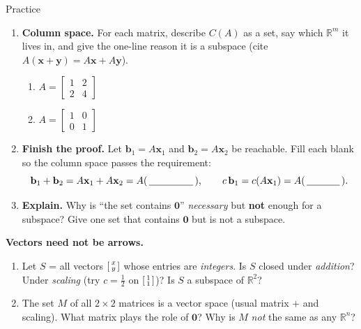 \documentclass[10pt]{article}
\newcommand{\xx}{\mathbf{x}}
\newcommand{\yy}{\mathbf{y}}
\newcommand{\bb}{\mathbf{b}}
\newcommand{\zero}{\mathbf{0}}
\begin{document}
\begin{notesbox}{Practice}
\begin{enumerate}[leftmargin=1.9em, itemsep=11pt]
\begin{enumerate}[label=(\alph*), leftmargin=1.8em, itemsep=6pt]
    \end{enumerate}
  \item \textbf{Column space.} For each matrix, describe $C(A)$ as a set, say which $\mathbb{R}^m$ it
        lives in, and give the one-line reason it is a subspace (cite $A(\xx+\yy)=A\xx+A\yy$).
    \begin{enumerate}[label=(\alph*), leftmargin=1.8em, itemsep=4pt]
      \item $A=\begin{bmatrix} 1 & 2 \\ 2 & 4 \end{bmatrix}$ \hfill
      \item $A=\begin{bmatrix} 1 & 0 \\ 0 & 1 \end{bmatrix}$
    \end{enumerate}
    \vspace{1.1cm}
  \item \textbf{Finish the proof.} Let $\bb_1=A\xx_1$ and $\bb_2=A\xx_2$ be reachable. Fill each
        blank so the column space passes the requirement:
        \[ \bb_1+\bb_2=A\xx_1+A\xx_2=A(\,\blank{1.6cm}\,), \qquad c\,\bb_1=c(A\xx_1)=A(\,\blank{1.2cm}\,). \]
        \vspace{0.2cm}
  \item \textbf{Explain.} Why is ``the set contains $\zero$'' \emph{necessary} but \textbf{not}
        enough for a subspace? Give one set that contains $\zero$ but is not a subspace. 
\end{enumerate}
\end{notesbox}

\begin{extensionbox}
\textbf{Vectors need not be arrows.}
\begin{enumerate}[label=(\alph*), leftmargin=1.8em, itemsep=5pt]
  \item Let $S$ = all vectors $\begin{bsmallmatrix} x\\y \end{bsmallmatrix}$ whose entries are
        \emph{integers}. Is $S$ closed under \emph{addition}? Under \emph{scaling} (try $c=\tfrac12$
        on $\begin{bsmallmatrix} 1\\1 \end{bsmallmatrix}$)? Is $S$ a subspace of $\mathbb{R}^2$?
  \item The set $M$ of all $2\times2$ matrices is a vector space (usual matrix $+$ and scaling).
        What matrix plays the role of $\zero$? Why is $M$ \emph{not} the same as any $\mathbb{R}^n$?
\end{enumerate}
\end{extensionbox}
\end{document}
